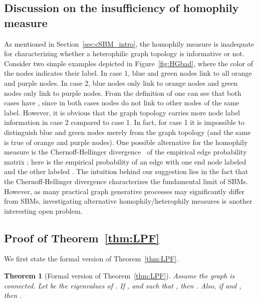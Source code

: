 \documentclass{article} \usepackage{iclr2021_conference,times}
\newtheorem{theorem}{Theorem}[section]
\begin{document}
\subsection{Discussion on the insufficiency of homophily measure }\label{sec:HGbad}
\begin{figure*}[ht]
  \centering
  \vspace{-0.2cm}
  \caption{A simple example for explaining the insufficiency of homophily measure .}\label{fig:HGbad}
\end{figure*}
As mentioned in Section~\ref{sec:cSBM_intro}, the homophily measure  is inadequate for characterizing whether a heterophilic graph topology is informative or not. Consider two simple examples depicted in Figure~\ref{fig:HGbad}, where the color of the nodes indicates their label. In case 1, blue and green nodes link to all orange and purple nodes. In case 2, blue nodes only link to orange nodes and green nodes only link to purple nodes. From the definition of  one can see that both cases have , since in both cases nodes do not link to other nodes of the same label. However, it is obvious that the graph topology carries more node label information in case 2 compared to case 1. In fact, for case 1 it is impossible to distinguish blue and green nodes merely from the graph topology (and the same is true of orange and purple nodes). One possible alternative for the homophily measure is the Chernoff-Hellinger divergence~\cite{abbe2017community} of the empirical edge probability matrix ; here  is the empirical probability of an edge with one end node labeled  and the other labeled . The intuition behind our suggestion lies in the fact that the Chernoff-Hellinger divergence characterizes the fundamental limit of SBMs. However, as many practical graph generative processes may significantly differ from SBMs, investigating alternative homophily/heterophily measures is another interesting open problem.

\subsection{Proof of Theorem~\ref{thm:LPF}}
We first state the formal version of Theorem~\ref{thm:LPF}.
\begin{theorem}[Formal version of Theorem~\ref{thm:LPF}]\label{thm:formal_LPF}
 Assume the graph  is connected. Let  be the eigenvalues of .
 If ,  and  such that , then . Also, if  and , then .
\end{theorem}
\end{document}
